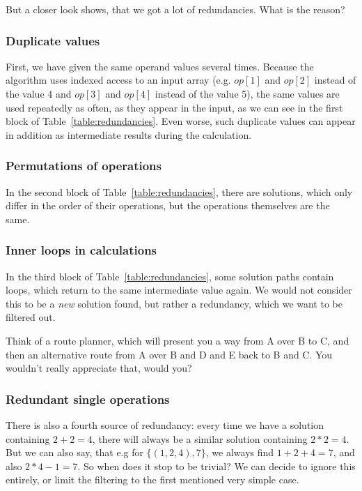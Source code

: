 \documentclass[english]{article}
\begin{document}
But a closer look shows, that we got a lot of redundancies. What is the reason?

\subsubsection{Duplicate values}

First, we have given the same operand values several times. Because the algorithm uses indexed access to an input array (e.g. $op\left[1\right]$ and $op\left[2\right]$ instead of the value 4 and $op\left[3\right]$ and $op\left[4\right]$ instead of the value 5), the same values are used repeatedly as often, as they appear in the input, as we can see in the first block of  Table~\ref{table:redundancies}. Even worse, such duplicate values can appear in addition as intermediate results during the calculation.

\subsubsection{Permutations of operations}

In the second block of  Table~\ref{table:redundancies}, there are solutions, which only differ in the order of their operations, but the operations themselves are the same.

\subsubsection{Inner loops in calculations}

In the third block of  Table~\ref{table:redundancies}, some solution paths contain loops, which return to the same intermediate value again. We would not consider this to be a \emph{new} solution found, but rather a redundancy, which we want to be filtered out.

Think of a route planner, which will present you a way from A over B to C, and then an alternative route from A over B and D and E back to B and C. You wouldn't really appreciate that, would you?

\subsubsection{Redundant single operations}

There is also a fourth source of redundancy: every time we have a solution containing $2+2=4$, there will always be a similar solution containing $2*2=4$. But we can also say, that e.g for $\lbrace\left(1, 2, 4\right), 7\rbrace$, we always find $1+2+4=7$, and also $2*4-1=7$. So when does it stop to be trivial? We can decide to ignore this entirely, or limit the filtering to the first mentioned very simple case.
\end{document}
